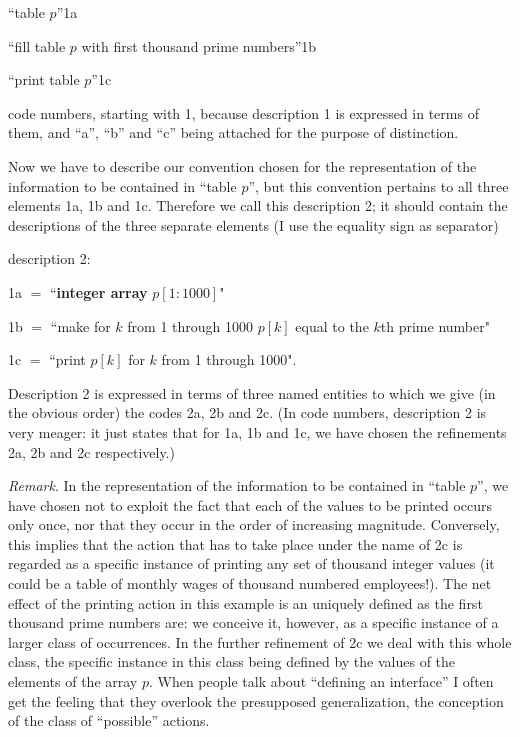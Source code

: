 \noindent
``table $p$''\hfill 1a

\noindent
``fill table $p$ with first thousand prime numbers''\hfill 1b

\noindent
``print table $p$''\hfill 1c

\noindent
code numbers, starting with 1, because description 1 is expressed in terms of them, and ``a'', ``b'' and ``c'' being attached for the purpose of distinction.

Now we have to describe our convention chosen for the representation of the information to be contained in ``table $p$'', but this convention pertains to all three elements 1a, 1b and 1c. Therefore we call this description 2; it should contain the descriptions of the three separate elements (I use the equality sign as separator)
\medskip

\noindent
description 2:
\nopagebreak

\noindent
1a $=$ ``\textbf{integer array} $p[1 : 1000]$"

\noindent
1b $=$ ``make for $k$ from 1 through 1000 $p[k]$ equal to the $k$th prime number"

\noindent
1c $=$ ``print $p[k]$ for $k$ from 1 through 1000".

Description 2 is expressed in terms of three named entities to which we give (in the obvious order) the codes 2a, 2b and 2c. (In code numbers, description 2 is very meager: it just states that for 1a, 1b and 1c, we have chosen the refinements 2a, 2b and 2c respectively.)

\noindent
\textit{Remark}. In the representation of the information to be contained in ``table $p$'', we have chosen not to exploit the fact that each of the values to be printed occurs only once, nor that they occur in the order of increasing magnitude. Conversely, this implies that the action that has to take place under the name of 2c is regarded as a specific instance of printing any set of thousand integer values (it could be a table of monthly wages of thousand numbered employees!). The net effect of the printing action in this example is an uniquely defined as the first thousand prime numbers are: we conceive it, however, as a specific instance of a larger class of occurrences. In the further refinement of 2c we deal with this whole class, the specific instance in this class being defined by the values of the elements of the array $p$. When people talk about ``defining an interface'' I often get the feeling that they overlook the presupposed generalization, the conception of the class of ``possible'' actions.


